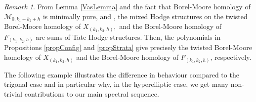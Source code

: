 \documentclass[10pt,a4paper,twoside]{amsart}
\theoremstyle{plain}
\theoremstyle{definition}
\theoremstyle{remark}
\newtheorem{rk}{Remark}[section]
\begin{document}
\begin{rk}
From Lemma \ref{VasLemma} and the fact that Borel-Moore homology of $\mathcal{M}_{0,k_1+k_2+h}$ is minimally pure, \cite[Definitions 3.1 and 5.1]{DL} and \cite[Lemma 2.5]{KL}, the mixed Hodge structures on the twisted Borel-Moore homology of $X_{(k_1,k_2,h)},$ and the Borel-Moore homology of $F_{(k_1,k_2,h)}$ are sums of Tate-Hodge structures. Then, the polynomials in Propositions \ref{propConfig} and \ref{propStrata} give precisely the twisted Borel-Moore homology of $X_{(k_1,k_2,h)}$ and the Borel-Moore homology of $F_{(k_1,k_2,h)}$, respectively. 
\end{rk}

The following example illustrates 
the difference in behaviour compared to the trigonal case and in particular why, in the hyperelliptic case, 
we get many non-trivial contributions to our main spectral sequence.
\end{document}
